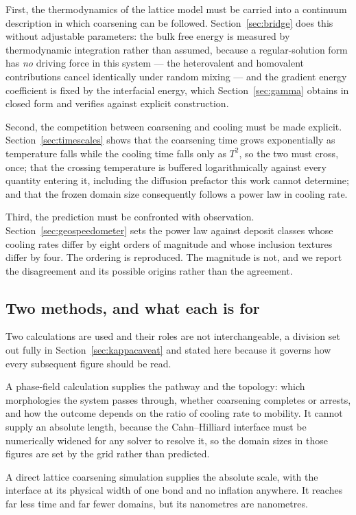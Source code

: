 \documentclass[preprint,12pt,authoryear]{elsarticle}
\begin{document}
First, the thermodynamics of the lattice model must be carried into a continuum
description in which coarsening can be followed. Section~\ref{sec:bridge} does
this without adjustable parameters: the bulk free energy is measured by
thermodynamic integration rather than assumed, because a regular-solution form
has \emph{no} driving force in this system --- the heterovalent and homovalent
contributions cancel identically under random mixing --- and the gradient energy
coefficient is fixed by the interfacial energy, which Section~\ref{sec:gamma}
obtains in closed form and verifies against explicit construction.

Second, the competition between coarsening and cooling must be made explicit.
Section~\ref{sec:timescales} shows that the coarsening time grows exponentially
as temperature falls while the cooling time falls only as $T^2$, so the two must
cross, once; that the crossing temperature is buffered logarithmically against
every quantity entering it, including the diffusion prefactor this work cannot
determine; and that the frozen domain size consequently follows a power law in
cooling rate.

Third, the prediction must be confronted with observation.
Section~\ref{sec:geospeedometer} sets the power law against deposit classes
whose cooling rates differ by eight orders of magnitude and whose inclusion
textures differ by four. The ordering is reproduced. The magnitude is not, and
we report the disagreement and its possible origins rather than the agreement.

\subsection{Two methods, and what each is for}

Two calculations are used and their roles are not interchangeable, a division
set out fully in Section~\ref{sec:kappacaveat} and stated here because it
governs how every subsequent figure should be read.

A phase-field calculation supplies the pathway and the topology: which
morphologies the system passes through, whether coarsening completes or
arrests, and how the outcome depends on the ratio of cooling rate to mobility.
It cannot supply an absolute length, because the Cahn--Hilliard interface must
be numerically widened for any solver to resolve it, so the domain sizes in
those figures are set by the grid rather than predicted.

A direct lattice coarsening simulation supplies the absolute scale, with the
interface at its physical width of one bond and no inflation anywhere. It
reaches far less time and far fewer domains, but its nanometres are nanometres.
\end{document}
